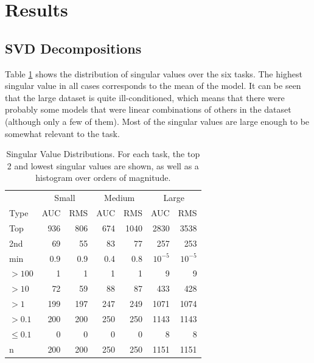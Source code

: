 \documentclass{article}
\begin{document}
\section{Results}

\subsection{SVD Decompositions}
\label{sec:svd-decomposition-results}

Table \ref{table:sv-distributions} shows the distribution of singular values over the six tasks.  The highest singular value in all cases corresponds to the mean of the model.  It can be seen that the large dataset is quite ill-conditioned, which means that there were probably some models that were linear combinations of others in the dataset (although only a few of them).  Most of the singular values are large enough to be somewhat relevant to the task.


\begin{table}[t]
\caption{Singular Value Distributions.  For each task, the top 2 and lowest singular values are shown, as well as a histogram over orders of magnitude.}
\label{table:sv-distributions}
\vskip 0.15in
\begin{center}
\begin{small}
\begin{sc}
\begin{tabular}{lrrrrrr}
\hline
\abovespace\belowspace
& \multicolumn{2}{c}{Small} & \multicolumn{2}{c}{Medium} & \multicolumn{2}{c}{Large} \\
Type & AUC & RMS & AUC & RMS & AUC & RMS \\
\hline
\abovespace
Top        & 936 & 806 & 674 & 1040 & 2830   & 3538 \\
2nd        &  69 &  55 &  83 &   77 &  257   &  253 \\
min        & 0.9 & 0.9 & 0.4 &  0.8 & $10^{-5}$& $10^{-5}$ \\
\abovespace
$> 100$    &   1 &   1 &   1 &    1 &    9   &    9 \\
$> 10$     &  72 &  59 &  88 &   87 &  433   &  428 \\
$> 1$      & 199 & 197 & 247 &  249 & 1071   & 1074 \\
$> 0.1$    & 200 & 200 & 250 &  250 & 1143   & 1143 \\
$\leq 0.1$ &   0 &   0 &   0 &    0 &    8   &    8 \\
\belowspace
n          & 200 & 200 & 250 &  250 & 1151   & 1151 \\
\hline
\end{tabular}
\end{sc}
\end{small}
\end{center}
\vskip -0.1in
\end{table}
\end{document}
